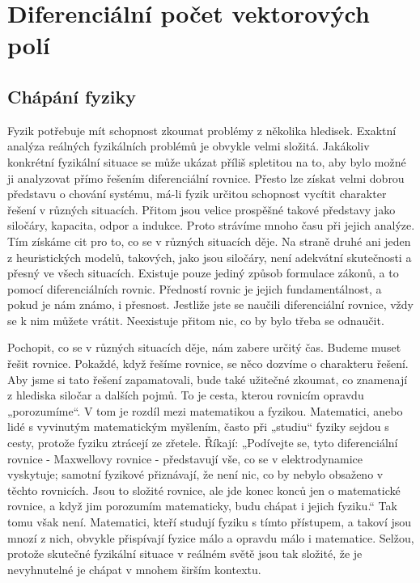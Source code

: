 {
\chapter{Diferenciální počet vektorových polí}\label{chap_fey_diff_vect_field}
\minitoc

  \section{Chápání fyziky}
    Fyzik potřebuje mít schopnost zkoumat problémy z několika hledisek. Exaktní analýza reálných 
    fyzikálních problémů je obvykle velmi složitá. Jakákoliv konkrétní fyzikální situace se může 
    ukázat příliš spletitou na to, aby bylo možné ji analyzovat přímo řešením diferenciální 
    rovnice. Přesto lze získat velmi dobrou představu o chování systému, má-li fyzik určitou 
    schopnost vycítit charakter řešení v různých situacích. Přitom jsou velice 
    prospěšné takové představy jako siločáry, kapacita, odpor a indukce. Proto strávíme mnoho času 
    při jejich analýze. Tím získáme cit pro to, co se v různých situacích děje. Na straně druhé ani 
    jeden z heuristických modelů, takových, jako jsou siločáry, není adekvátní skutečnosti a přesný 
    ve všech situacích. Existuje pouze jediný způsob formulace zákonů, a to pomocí diferenciálních 
    rovnic. Předností rovnic je jejich fundamentálnost, a pokud je nám známo, i přesnost. Jestliže 
    jste se naučili diferenciální rovnice, vždy se k nim můžete vrátit. Neexistuje přitom nic, co 
    by bylo třeba se odnaučit.
    
    Pochopit, co se v různých situacích děje, nám zabere určitý čas. Budeme muset řešit rovnice. 
    Pokaždé, když řešíme rovnice, se něco dozvíme o charakteru řešení. Aby jsme si tato řešení 
    zapamatovali, bude také užitečné zkoumat, co znamenají z hlediska siločar a dalších pojmů. To 
    je cesta, kterou rovnicím opravdu „porozumíme“. V tom je rozdíl mezi matematikou a fyzikou. 
    Matematici, anebo lidé s vyvinutým matematickým myšlením, často při „studiu“ fyziky sejdou s 
    cesty, protože fyziku ztrácejí ze zřetele. Říkají: „Podívejte se, tyto diferenciální rovnice - 
    Maxwellovy rovnice - představují vše, co se v elektrodynamice vyskytuje; samotní fyzikové 
    přiznávají, že není nic, co by nebylo obsaženo v těchto rovnicích. Jsou to složité rovnice, ale 
    jde konec konců jen o matematické rovnice, a když jim porozumím matematicky, budu chápat i 
    jejich fyziku.“ Tak tomu však není. Matematici, kteří studují fyziku s tímto přístupem, a 
    takoví jsou mnozí z nich, obvykle přispívají fyzice málo a opravdu málo i matematice. Selžou, 
    protože skutečné fyzikální situace v reálném světě jsou tak složité, že je nevyhnutelné je 
    chápat v mnohem širším kontextu.
    
}
